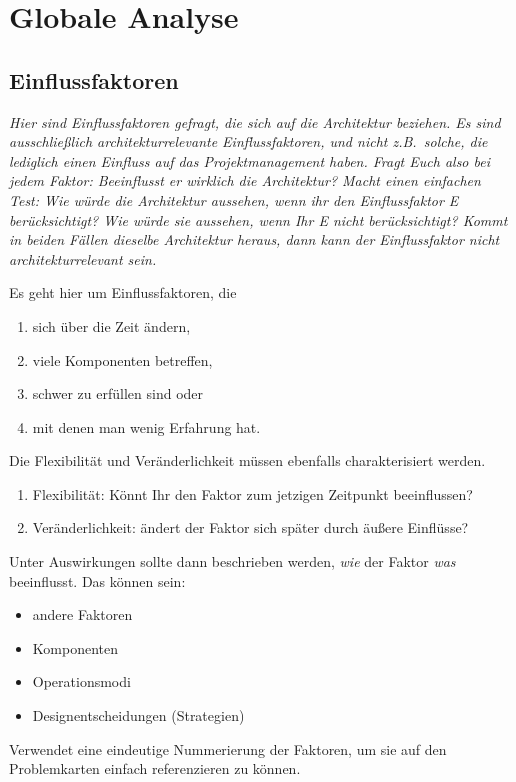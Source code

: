 \documentclass[fontsize=12pt,paper=a4,twoside]{scrartcl}
\begin{document}
\section{Globale Analyse}
\label{sec:globale_analyse}

\subsection{Einflussfaktoren}
\label{sec:einflussfaktoren}
{\it Hier sind Einflussfaktoren gefragt, die sich auf die Architektur
  beziehen. Es sind ausschließlich architekturrelevante
  Einflussfaktoren, und nicht z.B.\ solche, die lediglich einen
  Einfluss auf das Projektmanagement haben. Fragt Euch also bei jedem
  Faktor: Beeinflusst er wirklich die Architektur? Macht einen
  einfachen Test: Wie würde die Architektur aussehen, wenn ihr den
  Einflussfaktor E berücksichtigt? Wie würde sie aussehen, wenn Ihr E nicht
  berücksichtigt? Kommt in beiden Fällen dieselbe Architektur heraus,
  dann kann der Einflussfaktor nicht architekturrelevant sein.

  Es geht hier um Einflussfaktoren, die
  \begin{enumerate}
  \item sich über die Zeit ändern,
  \item viele Komponenten betreffen,
  \item schwer zu erfüllen sind oder
  \item mit denen man wenig Erfahrung hat.
  \end{enumerate}
  Die Flexibilität und Veränderlichkeit müssen ebenfalls charakterisiert werden. 
  \begin{enumerate}
  \item Flexibilität: Könnt Ihr den Faktor zum jetzigen Zeitpunkt beeinflussen?
  \item Veränderlichkeit: ändert der Faktor sich später durch äußere Einflüsse?
\end{enumerate}

  Unter Auswirkungen sollte dann beschrieben werden, {\em wie} der
  Faktor {\em was} beeinflusst. Das können sein:
  \begin{itemize}
  \item andere Faktoren
  \item Komponenten
  \item Operationsmodi
  \item Designentscheidungen (Strategien)
  \end{itemize}

  Verwendet eine eindeutige Nummerierung der Faktoren, um sie auf den
  Problemkarten einfach referenzieren zu können.  }\\
\end{document}
